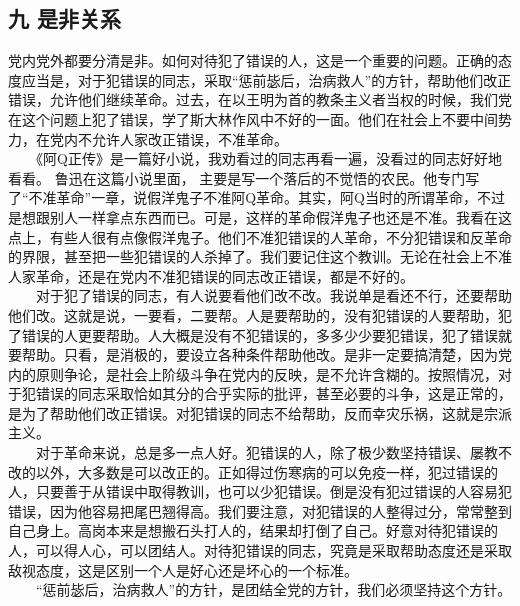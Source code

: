 \documentclass[cn,11pt,chinese]{elegantbook}
\def\myformat#1{\hfil\hfil #1}
\begin{document}
\subsection*{\myformat{九 是非关系}}
党内党外都要分清是非。如何对待犯了错误的人，这是一个重要的问题。正确的态度应当是，对于犯错误的同志，采取“惩前毖后，治病救人”的方针，帮助他们改正错误，允许他们继续革命。过去，在以王明为首的教条主义者当权的时候，我们党在这个问题上犯了错误，学了斯大林作风中不好的一面。他们在社会上不要中间势力，在党内不允许人家改正错误，不准革命。\\
　　《阿Q正传》是一篇好小说，我劝看过的同志再看一遍，没看过的同志好好地看看。 鲁迅在这篇小说里面， 主要是写一个落后的不觉悟的农民。他专门写了“不准革命”一章，说假洋鬼子不准阿Q革命。其实，阿Q当时的所谓革命，不过是想跟别人一样拿点东西而已。可是，这样的革命假洋鬼子也还是不准。我看在这点上，有些人很有点像假洋鬼子。他们不准犯错误的人革命，不分犯错误和反革命的界限，甚至把一些犯错误的人杀掉了。我们要记住这个教训。无论在社会上不准人家革命，还是在党内不准犯错误的同志改正错误，都是不好的。\\
　　对于犯了错误的同志，有人说要看他们改不改。我说单是看还不行，还要帮助他们改。这就是说，一要看，二要帮。人是要帮助的，没有犯错误的人要帮助，犯了错误的人更要帮助。人大概是没有不犯错误的，多多少少要犯错误，犯了错误就要帮助。只看，是消极的，要设立各种条件帮助他改。是非一定要搞清楚，因为党内的原则争论，是社会上阶级斗争在党内的反映，是不允许含糊的。按照情况，对于犯错误的同志采取恰如其分的合乎实际的批评，甚至必要的斗争，这是正常的，是为了帮助他们改正错误。对犯错误的同志不给帮助，反而幸灾乐祸，这就是宗派主义。\\
　　对于革命来说，总是多一点人好。犯错误的人，除了极少数坚持错误、屡教不改的以外，大多数是可以改正的。正如得过伤寒病的可以免疫一样，犯过错误的人，只要善于从错误中取得教训，也可以少犯错误。倒是没有犯过错误的人容易犯错误，因为他容易把尾巴翘得高。我们要注意，对犯错误的人整得过分，常常整到自己身上。高岗本来是想搬石头打人的，结果却打倒了自己。好意对待犯错误的人，可以得人心，可以团结人。对待犯错误的同志，究竟是采取帮助态度还是采取敌视态度，这是区别一个人是好心还是坏心的一个标准。\\
　　“惩前毖后，治病救人”的方针，是团结全党的方针，我们必须坚持这个方针。\\
\end{document}
